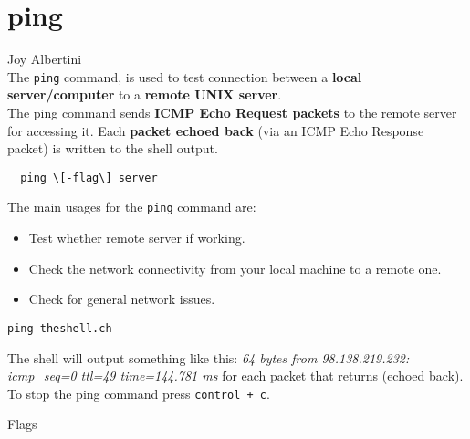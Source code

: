 \documentclass[hidelinks,12pt,a4paper,numbers=enddot]{scrartcl}
\begin{document}
\section{ping}


\large Joy Albertini \normalsize\\





The \texttt{ping} command, is used to test connection between a \textbf{local server/computer}
to a \textbf{remote UNIX server}.\\
The ping command sends \textbf{ICMP Echo Request packets} to the remote server for accessing it.
Each \textbf{packet echoed back } (via an ICMP Echo Response packet) is written to the shell output.

\begin{verbatim}
  ping \[-flag\] server
\end{verbatim}

The main usages for the \texttt{ping} command are:

\begin{itemize}
    \item Test whether remote server if working.
    \item Check the network connectivity from your local machine to a remote one.
    \item Check for general network issues.
\end{itemize}

\begin{verbatim}
ping theshell.ch
\end{verbatim}

The shell will output something like this:
\emph{64 bytes from 98.138.219.232: icmp\_seq=0 ttl=49 time=144.781 ms} for each packet
that returns (echoed back).\\

To stop the ping command press \texttt{control + c}.

Flags
\end{document}
